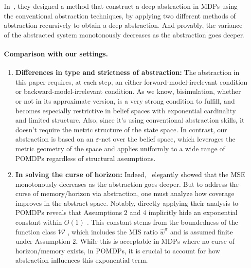 \documentclass[twoside]{article}
\newcommand{\CAL}[1]{\mathcal{#1}}
\begin{document}
In~\cite{hao2024off}, they designed a method that construct a deep abstraction in MDPs using the conventional abstraction techniques, by applying two different methods of abstraction recursively to obtain a deep abstraction. And provably, the variance of the abstracted system monotonously decreases as the abstraction goes deeper.

\paragraph{Comparison with our settings.}
\begin{enumerate}
    \item \textbf{Differences in type and strictness of abstraction:} The abstraction in this paper requires, at each step, an either forward-model-irrelevant condition or backward-model-irrelevant condition. As we know, bisimulation, whether or not in its approximate version, is a very strong condition to fulfill, and becomes especially restrictive in belief spaces with exponential cardinality and limited structure. Also, since it’s using conventional abstraction skills, it doesn’t require the metric structure of the state space. In contrast, our abstraction is based on an $\varepsilon$-net over the belief space, which leverages the metric geometry of the space and applies uniformly to a wide range of POMDPs regardless of structural assumptions.
    \item \textbf{In solving the curse of horizon:}  Indeed,~\cite{hao2024off} elegantly showed that the MSE monotonously decreases as the abstraction goes deeper. But to address the curse of memory/horizon via abstraction, one must analyze how coverage improves in the abstract space. Notably, directly applying their analysis to POMDPs reveals that Assumptions 2 and 4 implicitly hide an exponential constant within $O(1)$
. This constant stems from the boundedness of the function class $\CAL W$
, which includes the MIS ratio $\hat w^\pi$
 and is assumed finite under Assumption 2. While this is acceptable in MDPs where no curse of horizon/memory exists, in POMDPs, it is crucial to account for how abstraction influences this exponential term.
\end{enumerate}
\end{document}
